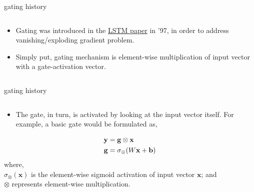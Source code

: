 \documentclass[aspectratio=169,xcolor={dvipsnames,svgnames}]{beamer}
\begin{document}
\begin{frame}[label={sec:gating-history}]{gating history}
\begin{columns}
\begin{column}{0.7\columnwidth}
\begin{itemize}
\item Gating was introduced in the \href{https://ieeexplore.ieee.org/abstract/document/6795963}{LSTM paper} in '97, in
order to address vanishing/exploding gradient
problem.
\item Simply put, gating mechanism is element-wise
multiplication of input vector with a gate-activation
vector.
\end{itemize}
\end{column}
\end{columns}
\end{frame}
\begin{frame}[label={sec:org46e0046}]{gating history}
\begin{columns}
\begin{column}{0.7\columnwidth}
\begin{itemize}
\item The gate, in turn, is activated by looking at the
input vector itself.  For example, a basic gate would
be formulated as,
\end{itemize}

\begin{align}
  \notag
  \mathbf{y} &= \mathbf{g} \otimes \mathbf{x} \\
  \notag
  \mathbf{g} &= \sigma_{\otimes}(W\mathbf{x} +
               \mathbf{b}) 
\end{align}
where, \\[0pt]
\(\sigma_{\otimes}(\mathbf{x})\) is the element-wise
sigmoid activation of input vector \(\mathbf{x}\); and \\[0pt]
\(\otimes\) represents element-wise multiplication.
\end{column}
\end{columns}
\end{frame}
\end{document}
